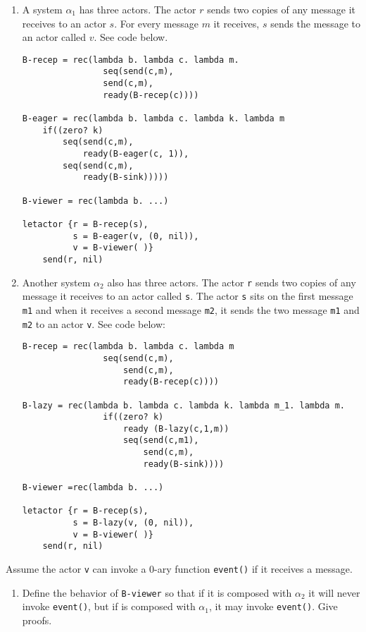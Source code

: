 \documentclass{article}
\begin{document}
\begin{enumerate}
\begin{enumerate}
\item A system $\alpha_1$ has three actors. The actor $r$ sends two copies of
any message it receives to an actor $s$. For every message $m$ it receives,
$s$ sends the message to an actor called $v$. See code below.
\begin{verbatim}
B-recep = rec(lambda b. lambda c. lambda m.
                seq(send(c,m),
                send(c,m),
                ready(B-recep(c))))

B-eager = rec(lambda b. lambda c. lambda k. lambda m
    if((zero? k)
        seq(send(c,m),
            ready(B-eager(c, 1)),
        seq(send(c,m),
            ready(B-sink)))))

B-viewer = rec(lambda b. ...)

letactor {r = B-recep(s),
          s = B-eager(v, (0, nil)),
          v = B-viewer( )}
    send(r, nil)
\end{verbatim}

\item Another system $\alpha_2$ also has three actors. The actor \texttt{r}
sends two copies of any message it receives to an actor called \texttt{s}. The
actor \texttt{s} sits on the first message \texttt{m1} and when it receives a
second message \texttt{m2}, it sends the two message \texttt{m1} and \texttt{m2}
to an actor \texttt{v}. See code below:
\begin{verbatim}
B-recep = rec(lambda b. lambda c. lambda m
                seq(send(c,m),
                    send(c,m),
                    ready(B-recep(c))))

B-lazy = rec(lambda b. lambda c. lambda k. lambda m_1. lambda m.
                if((zero? k)
                    ready (B-lazy(c,1,m))
                    seq(send(c,m1),
                        send(c,m),
                        ready(B-sink))))

B-viewer =rec(lambda b. ...)

letactor {r = B-recep(s),
          s = B-lazy(v, (0, nil)),
          v = B-viewer( )}
    send(r, nil)
\end{verbatim}
\end{enumerate}

Assume the actor \texttt{v} can invoke a 0-ary function \texttt{event()} if it
receives a message.
\begin{enumerate}
\item Define the behavior of \texttt{B-viewer} so that if it is composed with
$\alpha_2$ it will never invoke \texttt{event()}, but if is composed with
$\alpha_1$, it may invoke \texttt{event()}. Give proofs.
\end{enumerate}

\end{enumerate}
\end{document}
